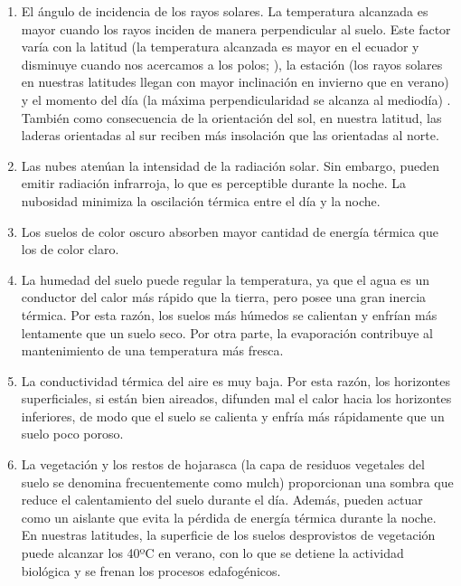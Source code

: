 \begin{enumerate}
    \item El ángulo de incidencia de los rayos solares. La temperatura
        alcanzada es mayor cuando los rayos inciden de manera perpendicular al
        suelo. Este factor varía con la latitud (la temperatura alcanzada es
        mayor en el ecuador y disminuye cuando nos acercamos a los polos;
        ), la estación (los rayos solares en nuestras latitudes
        llegan con mayor inclinación en invierno que en verano) y
        el momento del día (la máxima perpendicularidad se alcanza al mediodía)
        . También como consecuencia de la orientación del sol, en
        nuestra latitud, las laderas orientadas al sur reciben más insolación
        que las orientadas al norte.  
    \item Las nubes atenúan la intensidad de
        la radiación solar. Sin embargo, pueden emitir radiación infrarroja, lo
        que es perceptible durante la noche.  La nubosidad minimiza la
        oscilación térmica entre el día y la noche.  
    \item Los suelos de color
        oscuro absorben mayor cantidad de energía térmica que los de color
        claro.  
    \item La humedad del suelo puede regular la temperatura, ya que
        el agua es un conductor del calor más rápido que la tierra, pero posee
        una gran inercia térmica. Por esta razón, los suelos más húmedos se
        calientan y enfrían más lentamente que un suelo seco. Por otra parte,
        la evaporación contribuye al mantenimiento de una temperatura más
        fresca.   
    \item La conductividad térmica del aire es muy
        baja. Por esta razón, los horizontes superficiales, si están bien
        aireados, difunden mal el calor hacia los horizontes inferiores, de
        modo que el suelo se calienta y enfría más rápidamente que un suelo
        poco poroso.  
    \item La vegetación y los restos de hojarasca (la capa de
        residuos vegetales del suelo se denomina frecuentemente como mulch)
        proporcionan una sombra que reduce el calentamiento del suelo durante
        el día. Además, pueden actuar como un aislante que evita la pérdida de
        energía térmica durante la noche.  En nuestras latitudes, la superficie
        de los suelos desprovistos de vegetación puede alcanzar los 40ºC en
        verano, con lo que se detiene la actividad biológica y se frenan los
        procesos edafogénicos.  
\end{enumerate}
